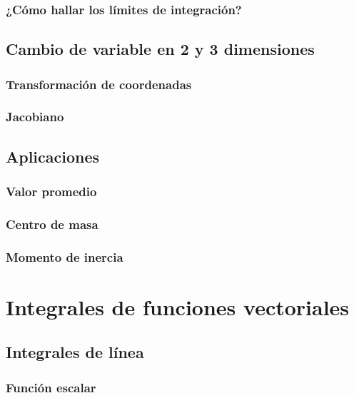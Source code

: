 \documentclass[12pt, fleqn]{report}                             %
\theoremstyle{break}                                            %
\begin{document}
            \subsection{¿Cómo hallar los límites de integración?}
            
        \section{Cambio de variable en 2 y 3 dimensiones}
        
            \subsection{Transformación de coordenadas}
            
            \subsection{Jacobiano}
            
        \section{Aplicaciones}
        
            \subsection{Valor promedio}
            
            \subsection{Centro de masa}
            
            \subsection{Momento de inercia}
        
    \chapter{Integrales de funciones vectoriales}
    
        \section{Integrales de línea}
        
            \subsection{Función escalar}
            
\end{document}

